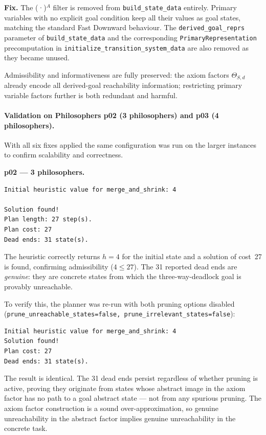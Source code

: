 \documentclass[11pt,a4paper]{article}
\begin{document}
\textbf{Fix.}  The (·)$^A$ filter is removed from \texttt{build\_state\_data}
entirely.  Primary variables with no explicit goal condition keep all their values as
goal states, matching the standard Fast Downward behaviour.  The
\texttt{derived\_goal\_reprs} parameter of \texttt{build\_state\_data} and the
corresponding \texttt{PrimaryRepresentation} precomputation in
\texttt{initialize\_transition\_system\_data} are also removed as they became unused.

Admissibility and informativeness are fully preserved: the axiom factors
$\Theta_{S,d}$ already encode all derived-goal reachability information; restricting
primary variable factors further is both redundant and harmful.

\paragraph{Validation on Philosophers p02 (3 philosophers) and p03 (4 philosophers).}

With all six fixes applied the same configuration was run on the larger
instances to confirm scalability and correctness.

\textbf{p02 — 3 philosophers.}

\begin{lstlisting}
Initial heuristic value for merge_and_shrink: 4

Solution found!
Plan length: 27 step(s).
Plan cost: 27
Dead ends: 31 state(s).
\end{lstlisting}

The heuristic correctly returns $h = 4$ for the initial state and a solution of
cost~27 is found, confirming admissibility ($4 \le 27$).  The 31 reported dead
ends are \emph{genuine}: they are concrete states from which the
three-way-deadlock goal is provably unreachable.

To verify this, the planner was re-run with both pruning options disabled
(\texttt{prune\_unreachable\_states=false, prune\_irrelevant\_states=false}):

\begin{lstlisting}
Initial heuristic value for merge_and_shrink: 4
Solution found!
Plan cost: 27
Dead ends: 31 state(s).
\end{lstlisting}

The result is identical.  The 31 dead ends persist regardless of whether
pruning is active, proving they originate from states whose abstract image in
the axiom factor has no path to a goal abstract state --- not from any spurious
pruning.  The axiom factor construction is a sound over-approximation, so
genuine unreachability in the abstract factor implies genuine unreachability in
the concrete task.
\end{document}
